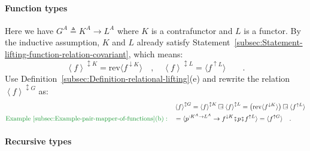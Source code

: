 \paragraph{Function types}

Here we have $G^{A}\triangleq K^{A}\rightarrow L^{A}$ where $K$
is a contrafunctor and $L$ is a functor. By the inductive assumption,
$K$ and $L$ already satisfy Statement~\ref{subsec:Statement-lifting-function-relation-covariant},
which means:
\[
\left<f\right>^{\updownarrow K}=\text{rev}\langle f^{\downarrow K}\rangle\quad,\quad\left<f\right>^{\updownarrow L}=\langle f^{\uparrow L}\rangle\quad\quad.
\]
 Use Definition~\ref{subsec:Definition-relational-lifting}(e) and
rewrite the relation $\left<f\right>^{\updownarrow G}$ as:
\begin{align*}
 & \left<f\right>^{\updownarrow G}=\left<f\right>^{\updownarrow K}\ogreaterthan\left<f\right>^{\updownarrow L}=\big(\text{rev}\langle f^{\downarrow K}\rangle\big)\ogreaterthan\langle f^{\uparrow L}\rangle\\
{\color{greenunder}\text{Example~\ref{subsec:Example-pair-mapper-of-functions}(b)}:}\quad & =\langle p^{:K^{A}\rightarrow L^{A}}\rightarrow f^{\downarrow K}\bef p\bef f^{\uparrow L}\rangle=\langle f^{\uparrow G}\rangle\quad.
\end{align*}


\paragraph{Recursive types}

